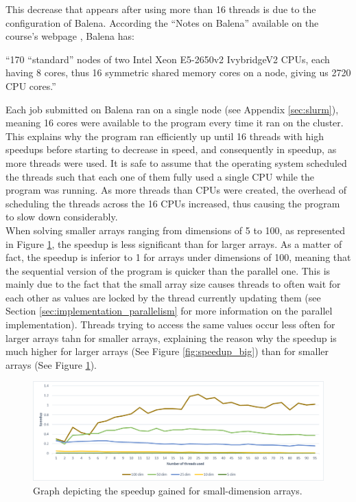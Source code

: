 \documentclass[letterpaper,12pt]{article}
\begin{document}
This decrease that appears after using more than 16 threads is due to the configuration of Balena. According the ``Notes on Balena'' available on the course's webpage \cite{balena_notes}, Balena has: 
\begin{displayquote}
``170 “standard” nodes of two Intel Xeon E5-2650v2 IvybridgeV2 CPUs, each having 8 cores, thus 16 symmetric shared memory cores on a node, giving us 2720 CPU cores.''
\end{displayquote} 
Each job submitted on Balena ran on a single node (see Appendix \ref{sec:slurm}), meaning 16 cores were available to the program every time it ran on the cluster. This explains why the program ran efficiently up until 16 threads with high speedups before starting to decrease in speed, and consequently in speedup, as more threads were used. It is safe to assume that the operating system scheduled the threads such that each one of them fully used a single CPU while the program was running. As more threads than CPUs were created, the overhead of scheduling the threads across the 16 CPUs increased, thus causing the program to slow down considerably.\\

When solving smaller arrays ranging from dimensions of 5 to 100, as represented in Figure \ref{fig:speedup_small}, the speedup is less significant than for larger arrays. As a matter of fact, the speedup is inferior to 1 for arrays under dimensions of 100, meaning that the sequential version of the program is quicker than the parallel one. This is mainly due to the fact that the small array size causes threads to often wait for each other as values are locked by the thread currently updating them (see Section \ref{sec:implementation_parallelism} for more information on the parallel implementation). Threads trying to access the same values occur less often for larger arrays tahn for smaller arrays, explaining the reason why the speedup is much higher for larger arrays (See Figure \ref{fig:speedup_big}) than for smaller arrays (See Figure \ref{fig:speedup_small}).\\

\begin{figure}[h]
\centerline{\includegraphics[width=\textwidth]{report/plots/speedup_small.png}}
\caption{\label{fig:speedup_small}Graph depicting the speedup gained for small-dimension arrays.}
\end{figure}
\end{document}
